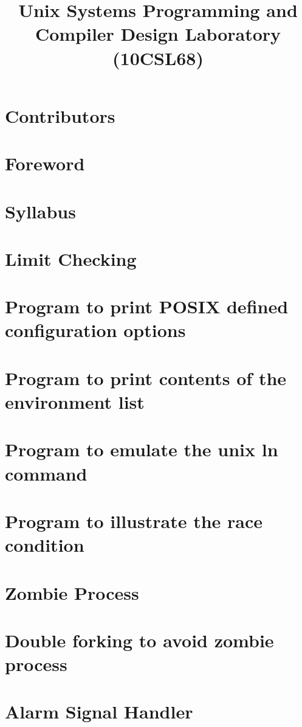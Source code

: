 \documentclass{report}
\begin{document}
\title{Unix Systems Programming and \\ Compiler Design Laboratory \\ (10CSL68)}
\maketitle

\chapter*{Contributors}


\chapter*{Foreword}


\chapter*{Syllabus}


\tableofcontents

\chapter{Limit Checking}


\chapter{Program to print POSIX defined configuration options}


\chapter{Program to print contents of the environment list}


\chapter{Program to emulate the unix ln command}


\chapter{Program to illustrate the race condition}


\chapter{Zombie Process}


\chapter{Double forking to avoid zombie process}


\chapter{Alarm Signal Handler}

\end{document}
